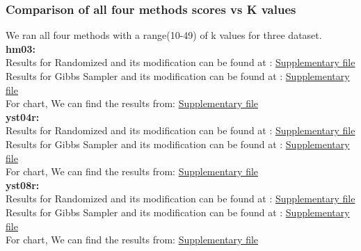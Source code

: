 \documentclass{article}
\begin{document}
\subsubsection{Comparison of all four methods scores vs K values}
We ran all four methods with a range(10-49) of k values for three dataset.\\
\textbf{hm03:}\\
Results for Randomized and its modification can be found at : \href{https://docs.google.com/spreadsheets/d/1NLuWuYod4BafkorDmi3lj8y2_z9ZDeY42Y-eZODlBIA/edit#gid=941656945}{Supplementary file}\\
Results for Gibbs Sampler and its modification can be found at : \href{https://docs.google.com/spreadsheets/d/1NLuWuYod4BafkorDmi3lj8y2_z9ZDeY42Y-eZODlBIA/edit#gid=182644779}{Supplementary file}\\
For chart, We can find the results from: \href{https://docs.google.com/spreadsheets/d/1NLuWuYod4BafkorDmi3lj8y2_z9ZDeY42Y-eZODlBIA/edit#gid=289031739}{Supplementary file}\\
\textbf{yst04r:}\\
Results for Randomized and its modification can be found at : \href{https://docs.google.com/spreadsheets/d/1NLuWuYod4BafkorDmi3lj8y2_z9ZDeY42Y-eZODlBIA/edit#gid=553407856}{Supplementary file}\\
Results for Gibbs Sampler and its modification can be found at : \href{https://docs.google.com/spreadsheets/d/1NLuWuYod4BafkorDmi3lj8y2_z9ZDeY42Y-eZODlBIA/edit#gid=1905433450}{Supplementary file}\\
For chart, We can find the results from: \href{https://docs.google.com/spreadsheets/d/1NLuWuYod4BafkorDmi3lj8y2_z9ZDeY42Y-eZODlBIA/edit#gid=620899954}{Supplementary file}\\
\textbf{yst08r:}\\
Results for Randomized and its modification can be found at : \href{https://docs.google.com/spreadsheets/d/1NLuWuYod4BafkorDmi3lj8y2_z9ZDeY42Y-eZODlBIA/edit#gid=2015343483}{Supplementary file}\\
Results for Gibbs Sampler and its modification can be found at : \href{https://docs.google.com/spreadsheets/d/1NLuWuYod4BafkorDmi3lj8y2_z9ZDeY42Y-eZODlBIA/edit#gid=1749351216}{Supplementary file}\\
For chart, We can find the results from: \href{https://docs.google.com/spreadsheets/d/1NLuWuYod4BafkorDmi3lj8y2_z9ZDeY42Y-eZODlBIA/edit#gid=1773781943}{Supplementary file}\\
\end{document}
